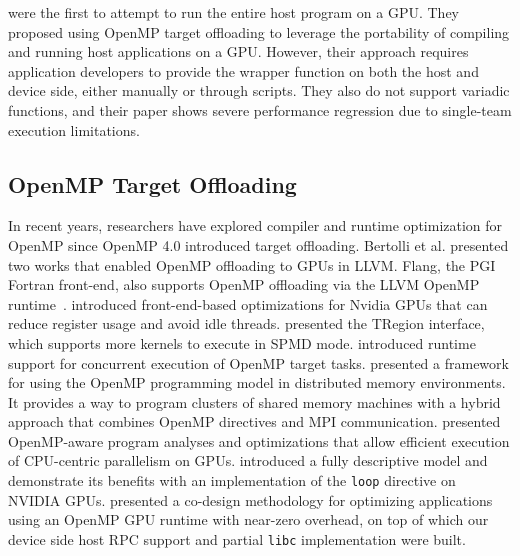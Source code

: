 \citet{DBLP:conf/llvmhpc/TianHPCD22} were the first to attempt to run the entire host program on a GPU.
They proposed using OpenMP target offloading to leverage the portability of compiling and running host applications on a GPU.
However, their approach requires application developers to provide the wrapper function on both the host and device side, either manually or through scripts.
They also do not support variadic functions, and their paper shows severe performance regression due to single-team execution limitations.

\subsection{OpenMP Target Offloading}

In recent years, researchers have explored compiler and runtime optimization for OpenMP since OpenMP 4.0 introduced target offloading.
Bertolli et al. presented two works \cite{DBLP:conf/sc/BertolliAEOSJCS14,DBLP:conf/sc/BertolliABJECSS15} that enabled OpenMP offloading to GPUs in LLVM.
Flang, the PGI Fortran front-end, also supports OpenMP offloading via the LLVM OpenMP runtime~\cite{OzenAtzeniWolfeEtAlOMPGPUoffloadingFlang2018}. 
\citet{DBLP:conf/sc/AntaoBJBERMJOSC16} introduced front-end-based optimizations for Nvidia GPUs that can reduce register usage and avoid idle threads.
\citet{DBLP:conf/iwomp/DoerfertDF19} presented the TRegion interface, which supports more kernels to execute in SPMD mode.
\citet{DBLP:conf/lcpc/TianDC20} introduced runtime support for concurrent execution of OpenMP target tasks.
\citet{DBLP:conf/icppw/YviquelPFVLRCCD22} presented a framework for using the OpenMP programming model in distributed memory environments.
It provides a way to program clusters of shared memory machines with a hybrid approach that combines OpenMP directives and MPI communication.
\citet{DBLP:conf/cgo/HuberCGTDDCD22} presented OpenMP-aware program analyses and optimizations that allow efficient execution of CPU-centric parallelism on GPUs.
\citet{DBLP:conf/cc/OzenW22} introduced a fully descriptive model and demonstrate its benefits with an implementation of the \lstinline{loop} directive on NVIDIA GPUs.
\citet{DBLP:conf/ipps/DoerfertPHTDCG22} presented a co-design methodology for optimizing applications using an OpenMP GPU runtime with near-zero overhead, on top of which our device side host RPC support and partial \texttt{libc} implementation were built.
